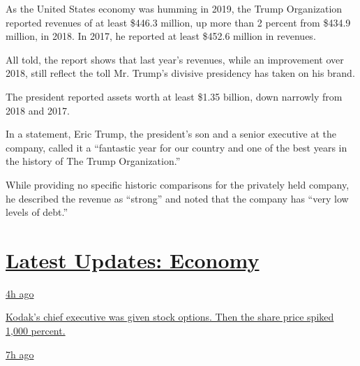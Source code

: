 As the United States economy was humming in 2019, the Trump Organization
reported revenues of at least \$446.3 million, up more than 2 percent
from \$434.9 million, in 2018. In 2017, he reported at least \$452.6
million in revenues.

All told, the report shows that last year's revenues, while an
improvement over 2018, still reflect the toll Mr. Trump's divisive
presidency has taken on his brand.

The president reported assets worth at least \$1.35 billion, down
narrowly from 2018 and 2017.

In a statement, Eric Trump, the president's son and a senior executive
at the company, called it a ``fantastic year for our country and one of
the best years in the history of The Trump Organization.''

While providing no specific historic comparisons for the privately held
company, he described the revenue as ``strong'' and noted that the
company has ``very low levels of debt.''

\hypertarget{latest-updates-economy}{%
\section{\texorpdfstring{\href{https://www.nytimes3xbfgragh.onion/live/2020/07/31/business/stock-market-today-coronavirus?action=click\&pgtype=Article\&state=default\&region=MAIN_CONTENT_1\&context=storylines_live_updates}{Latest
Updates:
Economy}}{Latest Updates: Economy}}\label{latest-updates-economy}}

\href{https://www.nytimes3xbfgragh.onion/live/2020/07/31/business/stock-market-today-coronavirus?action=click\&pgtype=Article\&state=default\&region=MAIN_CONTENT_1\&context=storylines_live_updates\#kodaks-chief-executive-was-given-stock-options-then-the-share-price-spiked-1000-percent}{4h
ago}

\href{https://www.nytimes3xbfgragh.onion/live/2020/07/31/business/stock-market-today-coronavirus?action=click\&pgtype=Article\&state=default\&region=MAIN_CONTENT_1\&context=storylines_live_updates\#kodaks-chief-executive-was-given-stock-options-then-the-share-price-spiked-1000-percent}{Kodak's
chief executive was given stock options. Then the share price spiked
1,000 percent.}

\href{https://www.nytimes3xbfgragh.onion/live/2020/07/31/business/stock-market-today-coronavirus?action=click\&pgtype=Article\&state=default\&region=MAIN_CONTENT_1\&context=storylines_live_updates\#fitch-ratings-downgrades-its-outlook-on-us-debt}{7h
ago}

